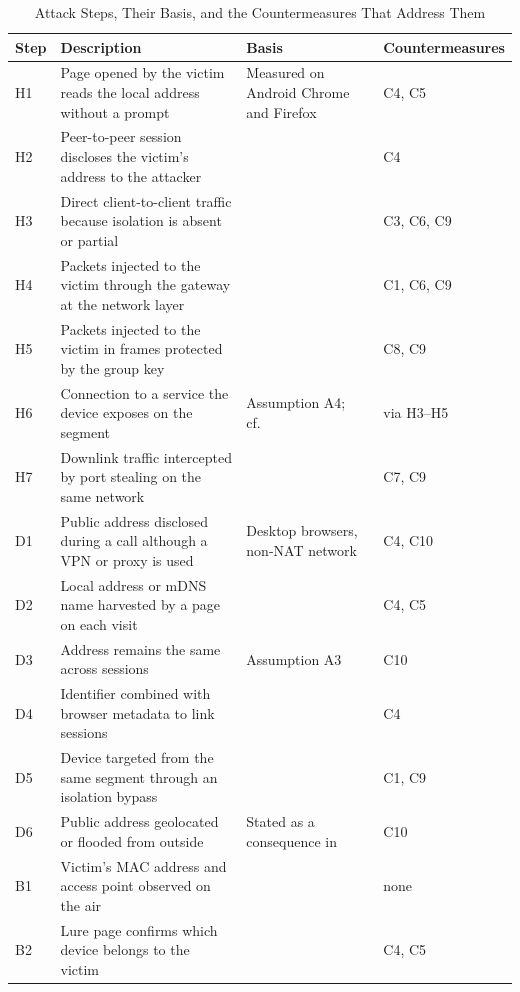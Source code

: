 \documentclass[conference]{IEEEtran}
\begin{document}
\begin{table}[t]
\caption{Attack Steps, Their Basis, and the Countermeasures That Address Them}
\label{tab:steps}
\centering
\footnotesize
\begin{tabularx}{\textwidth}{@{}L{0.5cm}YL{3.8cm}L{2.7cm}@{}}
\toprule
\textbf{Step} & \textbf{Description} & \textbf{Basis} & \textbf{Countermeasures} \\
\midrule
H1 & Page opened by the victim reads the local address without a prompt & Measured on Android Chrome and Firefox~\cite{koysha2025} & C4, C5 \\
H2 & Peer-to-peer session discloses the victim's address to the attacker & \cite{rfc8826,tang2022} & C4 \\
H3 & Direct client-to-client traffic because isolation is absent or partial & \cite{airsnitch2026} & C3, C6, C9 \\
H4 & Packets injected to the victim through the gateway at the network layer & \cite{airsnitch2026} & C1, C6, C9 \\
H5 & Packets injected to the victim in frames protected by the group key & \cite{airsnitch2026} & C8, C9 \\
H6 & Connection to a service the device exposes on the segment & Assumption A4; cf.~\cite{nibert2025} & via H3--H5 \\
H7 & Downlink traffic intercepted by port stealing on the same network & \cite{airsnitch2026} & C7, C9 \\
\addlinespace
D1 & Public address disclosed during a call although a VPN or proxy is used & Desktop browsers, non-NAT network~\cite{nibert2025} & C4, C10 \\
D2 & Local address or mDNS name harvested by a page on each visit & \cite{koysha2025} & C4, C5 \\
D3 & Address remains the same across sessions & Assumption A3 & C10 \\
D4 & Identifier combined with browser metadata to link sessions & \cite{koysha2025} & C4 \\
D5 & Device targeted from the same segment through an isolation bypass & \cite{airsnitch2026} & C1, C9 \\
D6 & Public address geolocated or flooded from outside & Stated as a consequence in~\cite{nibert2025} & C10 \\
\addlinespace
B1 & Victim's MAC address and access point observed on the air & \cite{airsnitch2026} & none \\
B2 & Lure page confirms which device belongs to the victim & \cite{koysha2025} & C4, C5 \\

\end{tabularx}
\end{table}
\end{document}

